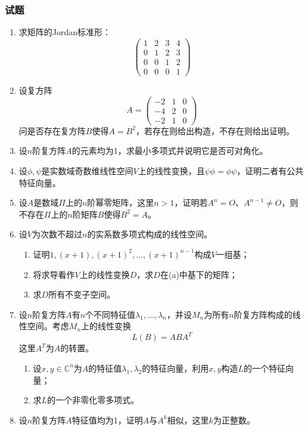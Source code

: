 \documentclass[a4paper,UTF8,fontset=windows,AutoFakeBold]{ctexart}
\begin{document}
\subsubsection{试题}
\begin{enumerate}
    \item 求矩阵的Jordan标准形：
    $$\begin{pmatrix}1&2&3&4\\0&1&2&3\\0&0&1&2\\0&0&0&1\end{pmatrix}$$
    \item 设复方阵
    $$A=\begin{pmatrix}-2&1&0\\-4&2&0\\-2&1&0\end{pmatrix}$$
    问是否存在复方阵$B$使得$A=B^2$，若存在则给出构造，不存在则给出证明。
    \item 设$n$阶复方阵$A$的元素均为1，求最小多项式并说明它是否可对角化。
    \item 设$\phi,\psi$是实数域奇数维线性空间$V$上的线性变换，且$\psi\phi=\phi\psi$，证明二者有公共特征向量。
    \item 设$A$是数域$\Pi$上的$n$阶幂零矩阵，这里$n>1$，证明若$A^n=O$、$A^{n-1}\ne O$，则不存在$\Pi$上的$n$阶矩阵$B$使得$B^2=A$。
    \item 设$V$为次数不超过$n$的实系数多项式构成的线性空间。
    \begin{enumerate}
        \item 证明$1,(x+1),(x+1)^2,\dots,(x+1)^{n-1}$构成$V$一组基；
        \item 将求导看作$V$上的线性变换$D$，求$D$在(a)中基下的矩阵；
        \item 求$D$所有不变子空间。
    \end{enumerate}
    \item 设$n$阶复方阵$A$有$n$个不同特征值$\lambda_1,\dots,\lambda_n$，并设$M_n$为所有$n$阶复方阵构成的线性空间。考虑$M_n$上的线性变换
    $$L(B)=ABA^T$$
    这里$A^T$为$A$的转置。
    \begin{enumerate}
        \item 设$x,y\in\mathbb{C}^n$为$A$的特征值$\lambda_1,\lambda_2$的特征向量，利用$x,y$构造$L$的一个特征向量；
        \item 求$L$的一个非零化零多项式。
    \end{enumerate}

    \item 设$n$阶复方阵$A$特征值均为1，证明$A$与$A^k$相似，这里$k$为正整数。
\end{enumerate}
\end{document}
